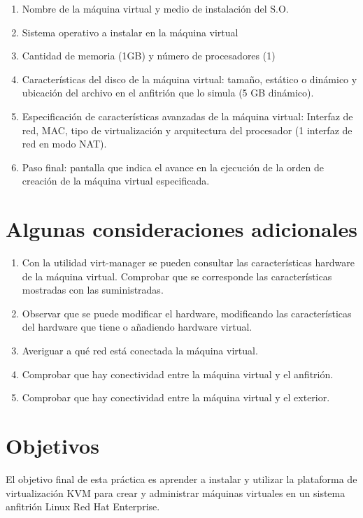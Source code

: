 \begin{enumerate}
    \item Nombre de la máquina virtual y medio de instalación del S.O. 
    \item Sistema operativo a instalar en la máquina virtual 
    \item Cantidad de memoria (1GB) y número de procesadores (1)
    \item Características del disco de la máquina virtual: tamaño, estático o dinámico y ubicación del archivo en el anfitrión que lo simula (5 GB dinámico). 
    \item Especificación de características avanzadas de la máquina virtual: Interfaz de red, MAC, tipo de virtualización y arquitectura del procesador (1 interfaz de red en modo NAT). 
    \item Paso final: pantalla que indica el avance en la ejecución de la orden de creación de la máquina virtual especificada.
\end{enumerate}


\section{Algunas consideraciones adicionales}
\begin{enumerate}
    \item Con	 la	 utilidad	 virt-manager se	 pueden	 consultar	 las	 características	
hardware	 de	 la	 máquina	 virtual.	 Comprobar	 que	 se	 corresponde	 las	
características	mostradas	con	las	suministradas.
    \item Observar	 que	 se	 puede	 modificar	 el	 hardware,	 modificando	 las	
características	del	hardware	que	tiene	o	añadiendo	hardware	virtual.
    \item Averiguar	a	qué	red	está	conectada	la	máquina	virtual.
    \item Comprobar que	hay	conectividad	entre	la	máquina	virtual	y	el	anfitrión.
    \item Comprobar que	hay	conectividad	entre	la	máquina	virtual	y	el	exterior.
\end{enumerate}


\section{Objetivos}
El objetivo final de esta práctica es aprender a instalar y utilizar la plataforma de virtualización KVM para crear y administrar máquinas virtuales en un sistema anfitrión Linux Red Hat Enterprise. 


